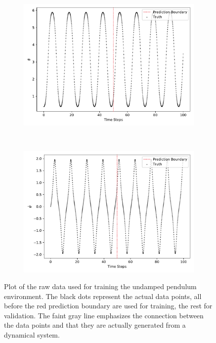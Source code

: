 			\begin{figure}
				\centering
				\begin{subfigure}{0.5\linewidth}
					\centering
					\includegraphics[width=\linewidth]{figures/experiments/environments/observations-pendulum-N0-D0.pdf}
				\end{subfigure}%
				~
				\begin{subfigure}{0.5\linewidth}
					\centering
					\includegraphics[width=\linewidth]{figures/experiments/environments/observations-pendulum-N0-D1.pdf}
				\end{subfigure}
				\caption{Plot of the raw data used for training the undamped pendulum environment. The black dots represent the actual data points, all before the red prediction boundary are used for training, the rest for validation. The faint gray line emphasizes the connection between the data points and that they are actually generated from a dynamical system.}
				\label{fig:envPendulum}
			\end{figure}
